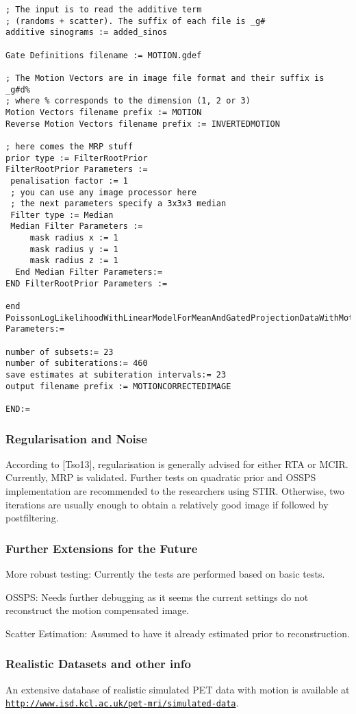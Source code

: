 \documentclass{article}
\def\url#1#2{\mbox{\href{#1}{\tt #2}}}
\begin{document}
{{{{\begin{verbatim}
; The input is to read the additive term 
; (randoms + scatter). The suffix of each file is _g#
additive sinograms := added_sinos

Gate Definitions filename := MOTION.gdef

; The Motion Vectors are in image file format and their suffix is _g#d% 
; where % corresponds to the dimension (1, 2 or 3) 
Motion Vectors filename prefix := MOTION
Reverse Motion Vectors filename prefix := INVERTEDMOTION

; here comes the MRP stuff
prior type := FilterRootPrior
FilterRootPrior Parameters :=
 penalisation factor := 1
 ; you can use any image processor here
 ; the next parameters specify a 3x3x3 median
 Filter type := Median
 Median Filter Parameters :=
     mask radius x := 1
     mask radius y := 1
     mask radius z := 1
  End Median Filter Parameters:=
END FilterRootPrior Parameters :=

end PoissonLogLikelihoodWithLinearModelForMeanAndGatedProjectionDataWithMotion Parameters:=

number of subsets:= 23
number of subiterations:= 460
save estimates at subiteration intervals:= 23 
output filename prefix := MOTIONCORRECTEDIMAGE

END:=
\end{verbatim}
}

\subsubsection{Regularisation and Noise}
According to [Tso13], regularisation is generally advised for either RTA or MCIR.
Currently, MRP is validated. Further tests on quadratic prior and OSSPS
implementation are recommended to the researchers using STIR. Otherwise, two
iterations are usually enough to obtain a relatively good image if followed by
postfiltering. 


\subsubsection{Further Extensions for the Future}
More robust testing: Currently the tests are performed based on basic tests.

OSSPS: Needs further debugging as it seems the current settings do not reconstruct the
motion compensated image. 

Scatter Estimation: Assumed to have it already estimated prior to reconstruction. 

\subsubsection{Realistic Datasets and other info}
An extensive
database of realistic simulated PET data with motion is available at\\
\url{http://www.isd.kcl.ac.uk/pet-mri/simulated-data/}{http://www.isd.kcl.ac.uk/pet-mri/simulated-data}. 

}}}
\end{document}
